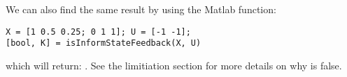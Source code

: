 We can also find the same result by using the Matlab function:
\begin{lstlisting}
X = [1 0.5 0.25; 0 1 1]; U = [-1 -1];
[bool, K] = isInformStateFeedback(X, U)
\end{lstlisting}
which will return: \mon{[ 0, [-1 -0.5] ]}. See the limitiation section for more details on why  is false.

%
%
